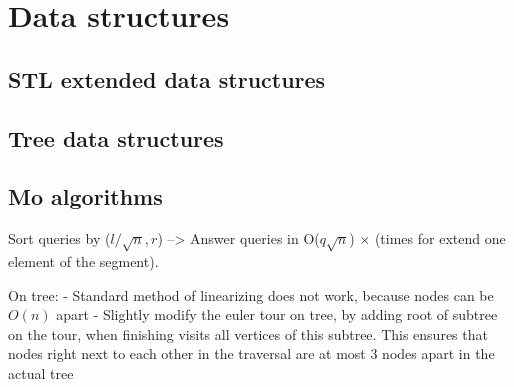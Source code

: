 \chapter{Data structures}

\section{STL extended data structures}

\section{Tree data structures}
\section{Mo algorithms}
    Sort queries by ($l / \sqrt{n} , r $)
    --> Answer queries in O($q \sqrt{n} $) $\times$ (times for extend one element of the segment).

    On tree:
    - Standard method of linearizing does not work, because nodes can be $O(n)$ apart
    - Slightly modify the euler tour on tree, by adding root of subtree on the tour, when finishing visits all vertices of this subtree. This ensures that nodes right next to each other in the traversal are at most 3 nodes apart in the actual tree


